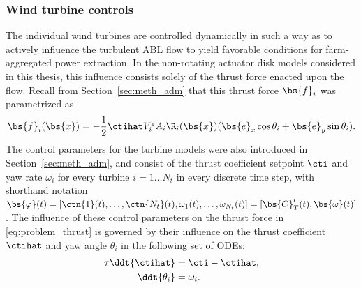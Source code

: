 \subsubsection{Wind turbine controls}\label{sec:opt_problem_controls}
The individual wind turbines are controlled dynamically in such a way as to actively influence the turbulent ABL flow to yield favorable conditions for farm-aggregated power extraction. In the non-rotating actuator disk models considered in this thesis, this influence consists solely of the thrust force enacted upon the flow. Recall from Section~\ref{sec:meth_adm} that this thrust force $\bs{f}_i$ was parametrized as
\begin{equation}\label{eq:problem_thrust}
\bs{f}_i(\bs{x}) = -\frac{1}{2} \ctihat V_i^2 A_i \R_i(\bs{x}) (\bs{e}_x \cos \theta_i + \bs{e}_y \sin \theta_i).
\end{equation} 
The control parameters for the turbine models were also introduced in Section~\ref{sec:meth_adm}, and consist of the thrust coefficient setpoint $\cti$ and yaw rate $\omega_i$ for every turbine $i = 1 \dots N_t$ in every discrete time step, with shorthand notation $\bs{\varphi}(t) = [\ctn{1}(t), \dots, \ctn{N_t}(t), \omega_1(t), \dots, \omega_{N_t}(t)] = [\bs{C}_T'(t), \bs{\omega}(t)]$. The influence of these control parameters on the thrust force in \eqref{eq:problem_thrust} is governed by their influence on the thrust coefficient $\ctihat$ and yaw angle $\theta_i$ in the following set of ODEs:
\begin{align}
\tau \ddt{\ctihat} &= \cti - \ctihat \label{eq:problem_timefilter_def},\\
\ddt{\theta_i} &= \omega_i \label{eq:problem_omega_def}.
\end{align}

